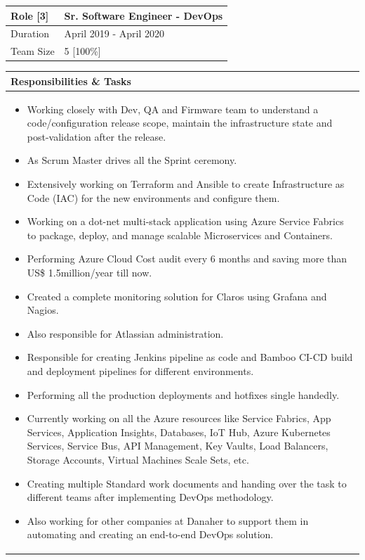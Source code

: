 \documentclass[11pt, a4paper]{article}
\begin{document}
\noindent\begin{tabular}{|p{1.5in}|p{5in}|}
\hline
\rowcolor{black!20} Role [3] & Sr. Software Engineer - DevOps\\
\hline
Duration & April 2019 - April 2020\\
\hline
Team Size & 5 [100\%]\\
\hline
\end{tabular}
\newline
\vspace*{1mm}
\newline
\begin{tabular}{|p{6.67in}|}
\hline
\rowcolor{black!5} Responsibilities \& Tasks\\
\hline
\begin{itemize}[noitemsep, nolistsep]
\item Working closely with Dev, QA and Firmware team to understand a code/configuration release scope, maintain the infrastructure state and post-validation after the release.
\item As Scrum Master drives all the Sprint ceremony.
\item Extensively working on Terraform and Ansible to create Infrastructure as Code (IAC) for the new environments and configure them.
\item Working on a dot-net multi-stack application using Azure Service Fabrics to package, deploy, and manage scalable Microservices and Containers.
\item Performing Azure Cloud Cost audit every 6 months and saving more than US\$ 1.5million/year till now.
\item Created a complete monitoring solution for Claros using Grafana and Nagios.
\item Also responsible for Atlassian administration. 
\item Responsible for creating Jenkins pipeline as code and Bamboo CI-CD build and deployment pipelines for different environments.
\item Performing all the production deployments and hotfixes single handedly.
\item Currently working on all the Azure resources like Service Fabrics, App Services, Application Insights, Databases, IoT Hub, Azure Kubernetes Services, Service Bus, API Management, Key Vaults, Load Balancers, Storage Accounts, Virtual Machines Scale Sets, etc.
\item Creating multiple Standard work documents and handing over the task to different teams after implementing DevOps methodology.
\item Also working for other companies at Danaher to support them in automating and creating an end-to-end DevOps solution.
\end{itemize} \\
\hline
\end{tabular}
\end{document}

